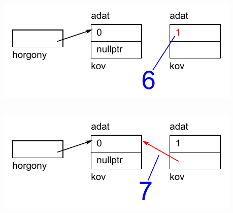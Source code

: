 \begin{frame}
  \begin{columns}[c]
      \begin{exampleblock}{}
        
      \end{exampleblock}
      \includegraphics[width=\textwidth]{verem/verem07.pdf}
  \end{columns}
\end{frame}

\begin{frame}
  \begin{columns}[c]
      \begin{exampleblock}{}
        
      \end{exampleblock}
      \includegraphics[width=\textwidth]{verem/verem08.pdf}
  \end{columns}
\end{frame}

